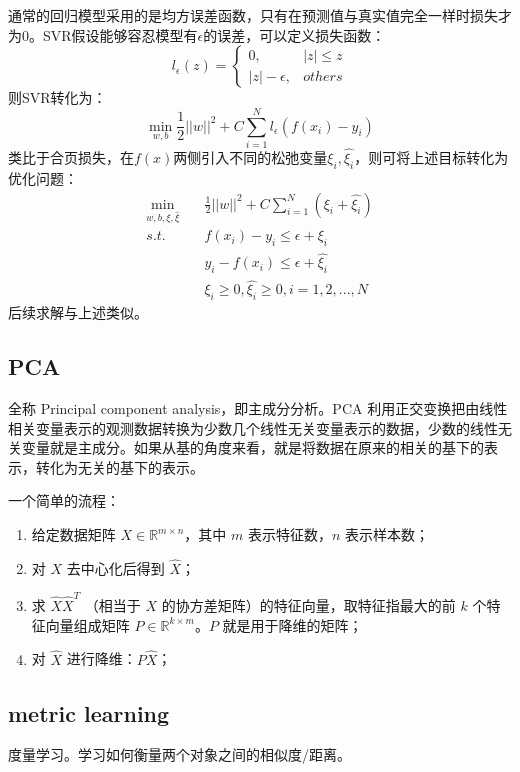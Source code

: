 通常的回归模型采用的是均方误差函数，只有在预测值与真实值完全一样时损失才为0。SVR假设能够容忍模型有$\epsilon$的误差，可以定义损失函数：
$$
l_\epsilon (z) = \begin{cases}0, &|z| \leq z \\ |z| - \epsilon, &others \end{cases}
$$
则SVR转化为：
$$
\mathop{min}_{w, b} \frac{1}{2} ||w||^2 + C \sum_{i=1}^N l_\epsilon (f(x_i) - y_i) 
$$
类比于合页损失，在$f(x)$两侧引入不同的松弛变量$\xi_i, \hat{\xi_i}$，则可将上述目标转化为优化问题：
\begin{align}
	\mathop{min}_{w, b, \xi, \hat{\xi}}\quad &\frac{1}{2} ||w||^2 + C \sum_{i=1}^{N} (\xi_i + \hat{\xi_i}) \nonumber \\
	s.t.\quad &f(x_i) - y_i \leq \epsilon + \xi_i \nonumber \\
			  &y_i - f(x_i) \leq \epsilon + \hat{\xi_i} \nonumber \\
			  &\xi_i \geq 0, \hat{\xi_i} \geq 0, i = 1, 2, ..., N \nonumber
\end{align}
后续求解与上述类似。


\subsection{PCA}
全称 Principal component analysis，即主成分分析。PCA 利用正交变换把由线性相关变量表示的观测数据转换为少数几个线性无关变量表示的数据，少数的线性无关变量就是主成分。如果从基的角度来看，就是将数据在原来的相关的基下的表示，转化为无关的基下的表示。

一个简单的流程：
\begin{enumerate}
	\item 给定数据矩阵 $X \in \mathbb{R}^{m \times n}$，其中 $m$ 表示特征数，$n$ 表示样本数；
	
	\item 对 $X$ 去中心化后得到 $\hat{X}$；
	
	\item 求 $\hat{X} \hat{X}^T$ （相当于 $X$ 的协方差矩阵）的特征向量，取特征指最大的前 $k$ 个特征向量组成矩阵 $P \in \mathbb{R}^{k \times m}$。$P$ 就是用于降维的矩阵；
	
	\item 对 $\hat{X}$ 进行降维：$P \hat{X}$；
\end{enumerate}


\subsection{metric learning} 
度量学习。学习如何衡量两个对象之间的相似度/距离。

